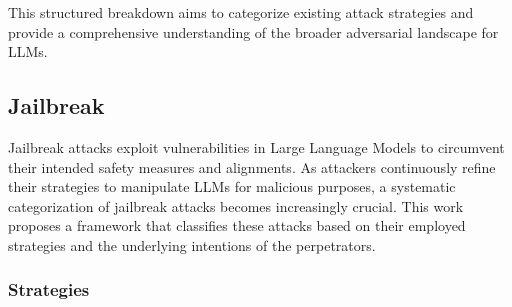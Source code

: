 This structured breakdown aims to categorize existing attack strategies and provide a comprehensive understanding of the broader adversarial landscape for LLMs.

\subsection{Jailbreak}
\label{jailbreak}
Jailbreak attacks exploit vulnerabilities in Large Language Models to circumvent their intended safety measures and alignments. As attackers continuously refine their strategies to manipulate LLMs for malicious purposes, a systematic categorization of jailbreak attacks becomes increasingly crucial. This work proposes a framework that classifies these attacks based on their employed strategies and the underlying intentions of the perpetrators. 

\subsubsection{Strategies}
 
